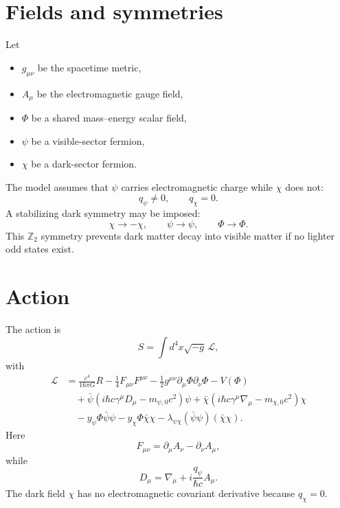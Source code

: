 \documentclass[11pt]{article}
\theoremstyle{remark}
\begin{document}
\section{Fields and symmetries}
Let
\begin{itemize}[leftmargin=2em]
    \item $g_{\mu\nu}$ be the spacetime metric,
    \item $A_\mu$ be the electromagnetic gauge field,
    \item $\Phi$ be a shared mass--energy scalar field,
    \item $\psi$ be a visible-sector fermion,
    \item $\chi$ be a dark-sector fermion.
\end{itemize}
The model assumes that $\psi$ carries electromagnetic charge while $\chi$ does not:
\begin{equation}
    q_\psi\neq 0,
    \qquad
    q_\chi=0.
\end{equation}
A stabilizing dark symmetry may be imposed:
\begin{equation}
    \chi\rightarrow -\chi,
    \qquad
    \psi\rightarrow\psi,
    \qquad
    \Phi\rightarrow\Phi.
\end{equation}
This $\mathbb Z_2$ symmetry prevents dark matter decay into visible matter if no lighter odd states exist.

\section{Action}
The action is
\begin{equation}
    S=\int d^4x\sqrt{-g}\,\mathcal L,
\end{equation}
with
\begin{align}
    \mathcal L
    &= \frac{c^4}{16\pi G}R
    -\frac14 F_{\mu\nu}F^{\mu\nu}
    -\frac12 g^{\mu\nu}\partial_\mu\Phi\partial_\nu\Phi
    -V(\Phi)
    \nonumber\\
    &\quad
    +\bar\psi\left(i\hbar c\gamma^\mu D_\mu-m_{\psi,0}c^2\right)\psi
    +\bar\chi\left(i\hbar c\gamma^\mu \nabla_\mu-m_{\chi,0}c^2\right)\chi
    \nonumber\\
    &\quad
    -y_\psi\Phi\bar\psi\psi
    -y_\chi\Phi\bar\chi\chi
    -\lambda_{\psi\chi}(\bar\psi\psi)(\bar\chi\chi).
    \label{eq:main-lagrangian}
\end{align}
Here
\begin{equation}
    F_{\mu\nu}=\partial_\mu A_\nu-\partial_\nu A_\mu,
\end{equation}
while
\begin{equation}
    D_\mu=\nabla_\mu+i\frac{q_\psi}{\hbar c}A_\mu.
\end{equation}
The dark field $\chi$ has no electromagnetic covariant derivative because $q_\chi=0$.
\end{document}
